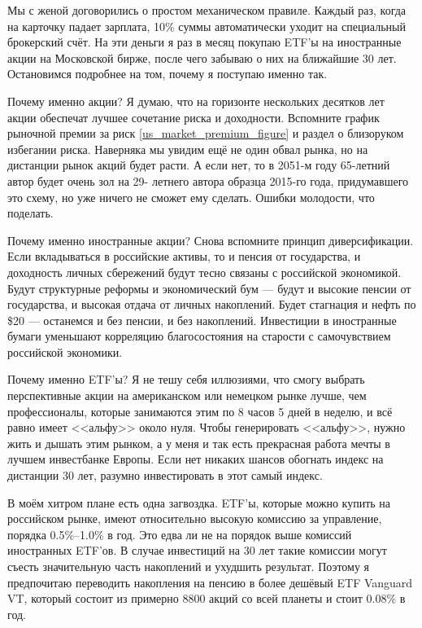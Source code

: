 Мы с женой договорились о простом механическом правиле. Каждый раз, когда на 
карточку падает зарплата, 10\% суммы автоматически уходит на специальный 
брокерский счёт. На эти деньги я раз в месяц покупаю ETF'ы на иностранные акции 
на Московской бирже, после чего забываю о них на ближайшие 30 лет. Остановимся 
подробнее на том, почему я поступаю именно так.
 
Почему именно акции? Я думаю, что на горизонте нескольких десятков лет акции 
обеспечат лучшее сочетание риска и доходности. Вспомните график рыночной премии 
за риск \ref{us_market_premium_figure} и раздел о близоруком избегании риска. 
Наверняка мы увидим ещё не один обвал рынка, но на дистанции рынок акций будет 
расти. А если нет, то в 2051-м году 65-летний автор будет очень зол на 29-
летнего автора образца 2015-го года, придумавшего это схему, но уже ничего не 
сможет ему сделать. Ошибки молодости, что поделать.

Почему именно иностранные акции? Снова вспомните принцип диверсификации. Если
вкладываться в российские активы, то и пенсия от государства, и доходность 
личных сбережений будут тесно связаны с российской экономикой. Будут структурные 
реформы и экономический бум --- будут и высокие пенсии от государства, и высокая 
отдача от личных накоплений. Будет стагнация и нефть по \$20 --- останемся и без 
пенсии, и без накоплений. Инвестиции в иностранные бумаги уменьшают корреляцию 
благосостояния на старости с самочувствием российской экономики.

Почему именно ETF'ы? Я не тешу себя иллюзиями, что смогу выбрать перспективные 
акции на американском или немецком рынке лучше, чем профессионалы, которые 
занимаются этим по 8 часов 5 дней в неделю, и всё равно имеет <<альфу>> около 
нуля. Чтобы генерировать <<альфу>>, нужно жить и дышать этим рынком, а у меня и 
так есть прекрасная работа мечты в лучшем инвестбанке Европы. Если нет никаких 
шансов обогнать индекс на дистанции 30 лет, разумно инвестировать в этот самый 
индекс.

В моём хитром плане есть одна загвоздка. ETF'ы, которые можно купить на 
российском рынке, имеют относительно высокую комиссию за управление, порядка 
0.5\%--1.0\% в год. Это едва ли не на порядок выше комиссий иностранных ETF'ов. 
В случае инвестиций на 30 лет такие комиссии могут съесть значительную часть 
накоплений и ухудшить результат. Поэтому я предпочитаю переводить накопления на 
пенсию в более дешёвый ETF Vanguard VT, который состоит из примерно 8800 акций 
со всей планеты и стоит 0.08\% в год.

